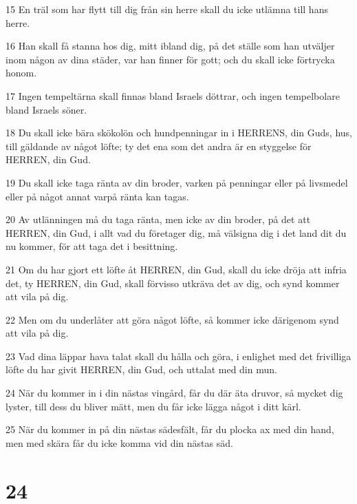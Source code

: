 \par 15 En träl som har flytt till dig från sin herre skall du icke utlämna till hans herre.
\par 16 Han skall få stanna hos dig, mitt ibland dig, på det ställe som han utväljer inom någon av dina städer, var han finner för gott; och du skall icke förtrycka honom.
\par 17 Ingen tempeltärna skall finnas bland Israels döttrar, och ingen tempelbolare bland Israels söner.
\par 18 Du skall icke bära skökolön och hundpenningar in i HERRENS, din Guds, hus, till gäldande av något löfte; ty det ena som det andra är en styggelse för HERREN, din Gud.
\par 19 Du skall icke taga ränta av din broder, varken på penningar eller på livsmedel eller på något annat varpå ränta kan tagas.
\par 20 Av utlänningen må du taga ränta, men icke av din broder, på det att HERREN, din Gud, i allt vad du företager dig, må välsigna dig i det land dit du nu kommer, för att taga det i besittning.
\par 21 Om du har gjort ett löfte åt HERREN, din Gud, skall du icke dröja att infria det, ty HERREN, din Gud, skall förvisso utkräva det av dig, och synd kommer att vila på dig.
\par 22 Men om du underlåter att göra något löfte, så kommer icke därigenom synd att vila på dig.
\par 23 Vad dina läppar hava talat skall du hålla och göra, i enlighet med det frivilliga löfte du har givit HERREN, din Gud, och uttalat med din mun.
\par 24 När du kommer in i din nästas vingård, får du där äta druvor, så mycket dig lyster, till dess du bliver mätt, men du får icke lägga något i ditt kärl.
\par 25 När du kommer in på din nästas sädesfält, får du plocka ax med din hand, men med skära får du icke komma vid din nästas säd.

\chapter{24}


